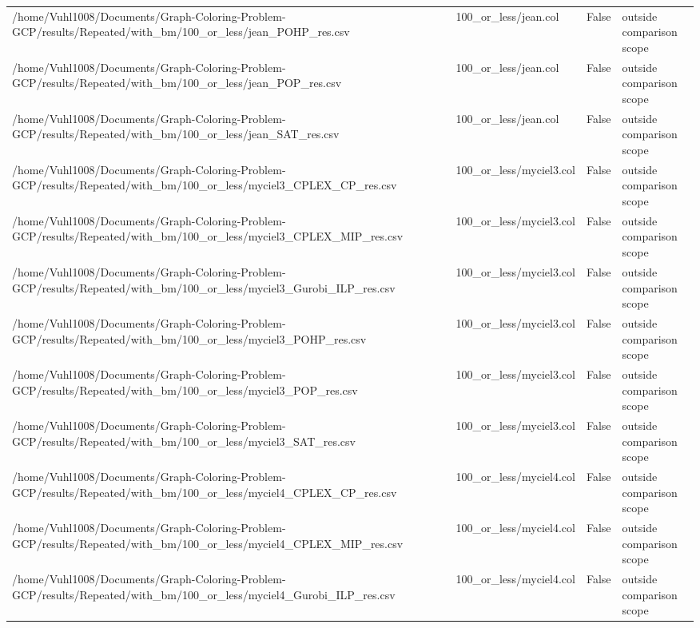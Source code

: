 \begin{table}[htbp]
\begin{tabular}{llll}
/home/Vuhl1008/Documents/Graph-Coloring-Problem-GCP/results/Repeated/with\_bm/100\_or\_less/jean\_POHP\_res.csv & 100\_or\_less/jean.col & False & outside comparison scope \\
/home/Vuhl1008/Documents/Graph-Coloring-Problem-GCP/results/Repeated/with\_bm/100\_or\_less/jean\_POP\_res.csv & 100\_or\_less/jean.col & False & outside comparison scope \\
/home/Vuhl1008/Documents/Graph-Coloring-Problem-GCP/results/Repeated/with\_bm/100\_or\_less/jean\_SAT\_res.csv & 100\_or\_less/jean.col & False & outside comparison scope \\
/home/Vuhl1008/Documents/Graph-Coloring-Problem-GCP/results/Repeated/with\_bm/100\_or\_less/myciel3\_CPLEX\_CP\_res.csv & 100\_or\_less/myciel3.col & False & outside comparison scope \\
/home/Vuhl1008/Documents/Graph-Coloring-Problem-GCP/results/Repeated/with\_bm/100\_or\_less/myciel3\_CPLEX\_MIP\_res.csv & 100\_or\_less/myciel3.col & False & outside comparison scope \\
/home/Vuhl1008/Documents/Graph-Coloring-Problem-GCP/results/Repeated/with\_bm/100\_or\_less/myciel3\_Gurobi\_ILP\_res.csv & 100\_or\_less/myciel3.col & False & outside comparison scope \\
/home/Vuhl1008/Documents/Graph-Coloring-Problem-GCP/results/Repeated/with\_bm/100\_or\_less/myciel3\_POHP\_res.csv & 100\_or\_less/myciel3.col & False & outside comparison scope \\
/home/Vuhl1008/Documents/Graph-Coloring-Problem-GCP/results/Repeated/with\_bm/100\_or\_less/myciel3\_POP\_res.csv & 100\_or\_less/myciel3.col & False & outside comparison scope \\
/home/Vuhl1008/Documents/Graph-Coloring-Problem-GCP/results/Repeated/with\_bm/100\_or\_less/myciel3\_SAT\_res.csv & 100\_or\_less/myciel3.col & False & outside comparison scope \\
/home/Vuhl1008/Documents/Graph-Coloring-Problem-GCP/results/Repeated/with\_bm/100\_or\_less/myciel4\_CPLEX\_CP\_res.csv & 100\_or\_less/myciel4.col & False & outside comparison scope \\
/home/Vuhl1008/Documents/Graph-Coloring-Problem-GCP/results/Repeated/with\_bm/100\_or\_less/myciel4\_CPLEX\_MIP\_res.csv & 100\_or\_less/myciel4.col & False & outside comparison scope \\
/home/Vuhl1008/Documents/Graph-Coloring-Problem-GCP/results/Repeated/with\_bm/100\_or\_less/myciel4\_Gurobi\_ILP\_res.csv & 100\_or\_less/myciel4.col & False & outside comparison scope \\

\end{tabular}
\end{table}
